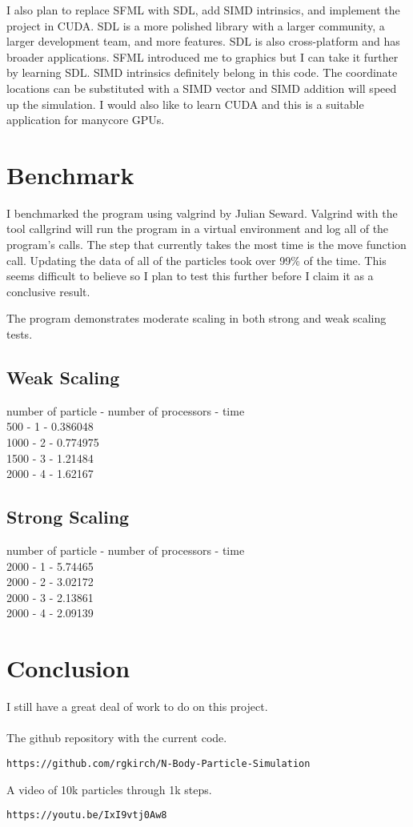 \documentclass[12pt]{article}
\begin{document}
I also plan to replace SFML with SDL, add SIMD intrinsics, and implement the project in CUDA. SDL is a more polished library with a larger community, a larger development team, and more features. SDL is also cross-platform and has broader applications. SFML introduced me to graphics but I can take it further by learning SDL. SIMD intrinsics definitely belong in this code. The coordinate locations can be substituted with a SIMD vector and SIMD addition will speed up the simulation. I would also like to learn CUDA and this is a suitable application for manycore GPUs.
\section{Benchmark}
I benchmarked the program using valgrind by Julian Seward. Valgrind with the tool callgrind will run the program in a virtual environment and log all of the program's calls. The step that currently takes the most time is the move function call. Updating the data of all of the particles took over 99\% of the time. This seems difficult to believe so I plan to test this further before I claim it as a conclusive result.

The program demonstrates moderate scaling in both strong and weak scaling tests.
\subsection{Weak Scaling}
number of particle - number of processors - time
\\
500 - 1 - 0.386048
\\
1000 - 2 - 0.774975
\\
1500 - 3 - 1.21484
\\
2000 - 4 - 1.62167
\subsection{Strong Scaling}
number of particle - number of processors - time
\\
2000 - 1 - 5.74465
\\
2000 - 2 - 3.02172
\\
2000 - 3 - 2.13861
\\
2000 - 4 - 2.09139
\section{Conclusion}
I still have a great deal of work to do on this project.
\\
\\
The github repository with the current code.
\begin{verbatim}
https://github.com/rgkirch/N-Body-Particle-Simulation
\end{verbatim}
A video of 10k particles through 1k steps.
\begin{verbatim}
https://youtu.be/IxI9vtj0Aw8
\end{verbatim}
\end{document}
